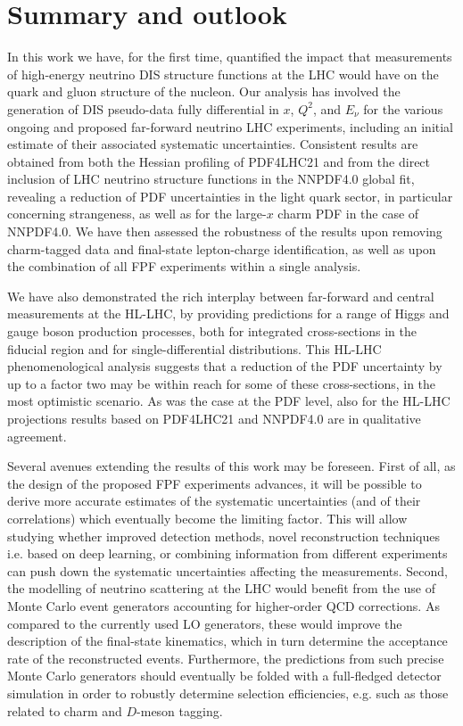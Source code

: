 \clearpage
\section{Summary and outlook}
\label{sec:summary}

In this work we have, for the first time,
quantified the impact that measurements of high-energy
neutrino DIS structure functions at the LHC would have on the quark
and gluon structure of the nucleon.
%
Our analysis has involved the generation of
DIS pseudo-data fully differential in $x$, $Q^2$, and $E_\nu$
for the various ongoing and proposed far-forward
neutrino LHC experiments, including an initial estimate
of their associated systematic uncertainties.
%
Consistent results are obtained from both the Hessian profiling
of PDF4LHC21 and from the direct inclusion of LHC neutrino
structure functions in the NNPDF4.0 global
fit, revealing a reduction of PDF uncertainties in the
light quark sector, in particular concerning strangeness, as well
as for the large-$x$ charm PDF in the case of NNPDF4.0.
%
We have then assessed the  robustness of the results upon
removing charm-tagged data and final-state lepton-charge
identification, as well as upon the combination
of all FPF experiments within a single analysis.

We have also demonstrated the rich interplay between
far-forward and central measurements
at the HL-LHC, by providing predictions
for a range of Higgs and gauge boson production processes,
both for integrated cross-sections in the fiducial region and for
single-differential distributions.
%
This HL-LHC phenomenological analysis suggests that a reduction
of the  PDF uncertainty by up to a factor two
may be within reach for some of these cross-sections,
in the most optimistic scenario.
%
As was the case at the PDF level, also for 
the HL-LHC projections results based on  PDF4LHC21 and NNPDF4.0
are in qualitative agreement.

Several avenues extending the results of this work may be foreseen.
%
First of all, as the design of the proposed FPF experiments
 advances, it will be possible to derive
 more accurate estimates of the systematic
uncertainties (and of their correlations) 
which eventually become the limiting factor.
%
This will allow studying whether  improved detection methods,
novel reconstruction techniques i.e. based
on deep learning, or combining information from different
experiments can  push down the systematic uncertainties
affecting the measurements.
%
Second, the modelling of neutrino scattering at the LHC would benefit from
the use of Monte Carlo event generators accounting
for higher-order QCD corrections.
%
As compared to the currently used LO generators,
these would improve the description of the final-state
kinematics, which in turn determine the acceptance rate
of the reconstructed events.
%
Furthermore, the predictions from such precise Monte Carlo generators
should eventually be folded with a full-fledged detector simulation
in order to robustly determine selection efficiencies, e.g.
such as those related to charm and $D$-meson tagging.

